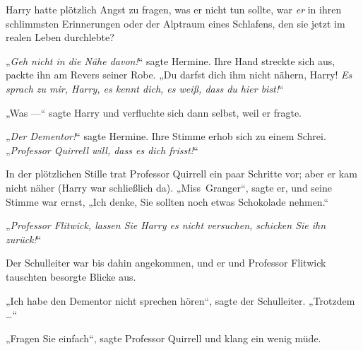 Harry hatte plötzlich Angst zu fragen, was er nicht tun sollte, war \emph{er} in ihren schlimmsten Erinnerungen oder der Alptraum eines Schlafens, den sie jetzt im realen Leben durchlebte?

„\emph{Geh nicht in die Nähe davon!}“ sagte Hermine. Ihre Hand streckte sich aus, packte ihn am Revers seiner Robe.
„Du darfst dich ihm nicht nähern, Harry! \emph{Es sprach zu mir, Harry, es kennt dich, es weiß, dass du hier bist!}“

„Was —“ sagte Harry und verfluchte sich dann selbst, weil er fragte.

„\emph{Der Dementor!}“ sagte Hermine. Ihre Stimme erhob sich zu einem Schrei.
„\emph{Professor Quirrell will, dass es dich frisst!}“

In der plötzlichen Stille trat Professor Quirrell ein paar Schritte vor; aber er kam nicht näher (Harry war schließlich da).
„Miss~Granger“, sagte er, und seine Stimme war ernst,
„Ich denke, Sie sollten noch etwas Schokolade nehmen.“

„\emph{Professor Flitwick, lassen Sie Harry es nicht versuchen, schicken Sie ihn zurück!}“

Der Schulleiter war bis dahin angekommen, und er und Professor Flitwick tauschten besorgte Blicke aus.

„Ich habe den Dementor nicht sprechen hören“, sagte der Schulleiter.
„Trotzdem …“

„Fragen Sie einfach“, sagte Professor Quirrell und klang ein wenig müde.

